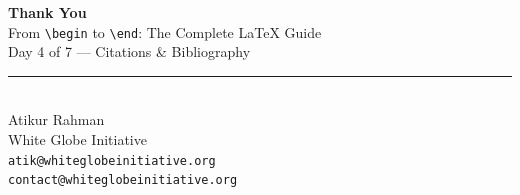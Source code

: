 \documentclass[11pt,aspectratio=169]{beamer}
\begin{document}
\begin{frame}[plain]
  \begin{center}
    \vspace{35pt}
    {\Large\bfseries Thank You}\\[10pt]
    {\large From \texttt{\textbackslash begin} to \texttt{\textbackslash end}: The Complete LaTeX Guide}\\[4pt]
    Day 4 of 7 --- Citations \& Bibliography\\[20pt]
    \rule{0.5\textwidth}{0.4pt}\\[10pt]
    Atikur Rahman \\
    White Globe Initiative \\[2pt]
    \texttt{atik@whiteglobeinitiative.org} \\
    \texttt{contact@whiteglobeinitiative.org}
  \end{center}
\end{frame}
\end{document}
